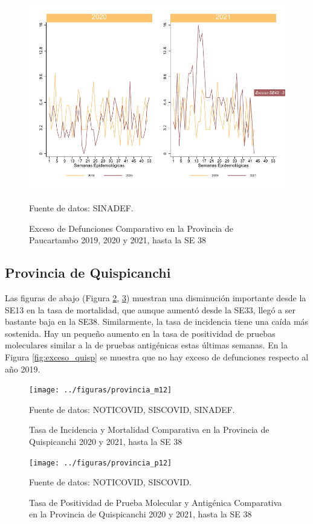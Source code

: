 \documentclass[12pt,a4paper,openany]{book}
\begin{document}
	\begin{figure}[h]
	\caption{Exceso de Defunciones Comparativo en la Provincia de Paucartambo 2019, 2020 y 2021, hasta la SE 38}\label{fig:exceso_paucartam}
	\begin{center}
		\includegraphics[width=0.7\linewidth]{../figuras/exceso_11}
	\end{center}
	{\footnotesize {Fuente de datos: SINADEF.}}
	\end{figure}

\clearpage

	\subsection*{Provincia de Quispicanchi}
	\noindent Las figuras de abajo (Figura \ref{fig:inc_mort_quisp}, \ref{fig:positividad_quisp})  muestran una disminución importante desde la SE13 en la tasa de mortalidad, que aunque aumentó desde la SE33, llegó a ser bastante baja en la SE38. Similarmente, la tasa de incidencia tiene una caída más sostenida. Hay un pequeño aumento en la tasa de positividad de pruebas moleculares similar a la de pruebas antigénicas estas últimas semanas. En la Figura \ref{fig:exceso_quisp} se muestra que no hay exceso de defunciones respecto al año 2019.

	\begin{figure}[h]
	\caption{Tasa de Incidencia y Mortalidad Comparativa en la Provincia de Quispicanchi 2020 y 2021, hasta la SE 38}\label{fig:inc_mort_quisp}
	\begin{center}
		\texttt{[image: ../figuras/provincia\_m12]}
	\end{center}
	{\footnotesize {Fuente de datos: NOTICOVID, SISCOVID, SINADEF.}}
	\end{figure}

	\begin{figure}[h]
	\caption{Tasa de Positividad de Prueba Molecular y Antigénica Comparativa en la Provincia de Quispicanchi 2020 y 2021, hasta la SE 38}\label{fig:positividad_quisp}
	\begin{center}
		\texttt{[image: ../figuras/provincia\_p12]}
	\end{center}
	{\footnotesize {Fuente de datos: NOTICOVID, SISCOVID.}}
	\end{figure}
\end{document}
